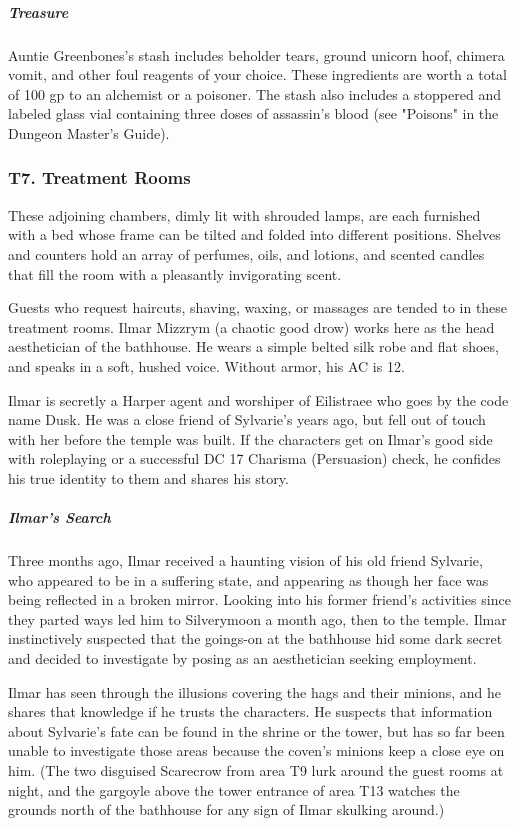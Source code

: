 \documentclass[10pt,a4paper,twoside,bg=print,twocolumn,openany,nodeprecatedcode]{dndbook}
\begin{document}
\subparagraph{Treasure}
Auntie Greenbones's stash includes beholder tears, ground unicorn hoof, chimera vomit, and other foul reagents of your choice. These ingredients are worth a total of 100 gp to an alchemist or a poisoner. The stash also includes a stoppered and labeled glass vial containing three doses of assassin's blood (see "Poisons" in the Dungeon Master's Guide).

\subsubsection{T7. Treatment Rooms}
\begin{DndReadAloud}{}
These adjoining chambers, dimly lit with shrouded lamps, are each furnished with a bed whose frame can be tilted and folded into different positions. Shelves and counters hold an array of perfumes, oils, and lotions, and scented candles that fill the room with a pleasantly invigorating scent.

\end{DndReadAloud}

Guests who request haircuts, shaving, waxing, or massages are tended to in these treatment rooms. Ilmar Mizzrym (a chaotic good drow) works here as the head aesthetician of the bathhouse. He wears a simple belted silk robe and flat shoes, and speaks in a soft, hushed voice. Without armor, his AC is 12.

Ilmar is secretly a Harper agent and worshiper of Eilistraee who goes by the code name Dusk. He was a close friend of Sylvarie's years ago, but fell out of touch with her before the temple was built. If the characters get on Ilmar's good side with roleplaying or a successful DC 17 Charisma (Persuasion) check, he confides his true identity to them and shares his story.

\subparagraph{Ilmar's Search}
Three months ago, Ilmar received a haunting vision of his old friend Sylvarie, who appeared to be in a suffering state, and appearing as though her face was being reflected in a broken mirror. Looking into his former friend's activities since they parted ways led him to Silverymoon a month ago, then to the temple. Ilmar instinctively suspected that the goings-on at the bathhouse hid some dark secret and decided to investigate by posing as an aesthetician seeking employment.

Ilmar has seen through the illusions covering the hags and their minions, and he shares that knowledge if he trusts the characters. He suspects that information about Sylvarie's fate can be found in the shrine or the tower, but has so far been unable to investigate those areas because the coven's minions keep a close eye on him. (The two disguised Scarecrow from area T9 lurk around the guest rooms at night, and the gargoyle above the tower entrance of area T13 watches the grounds north of the bathhouse for any sign of Ilmar skulking around.)
\end{document}
